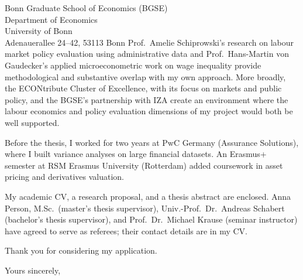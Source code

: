 \documentclass[a4paper,11pt]{letter}
\begin{document}
\begin{letter}{%
    Bonn Graduate School of Economics (BGSE) \\
    Department of Economics \\
    University of Bonn \\
    Adenauerallee 24--42, 53113 Bonn
}
Prof.\ Amelie Schiprowski's research on labour market policy evaluation using administrative data and Prof.\ Hans-Martin von Gaudecker's applied microeconometric work on wage inequality provide methodological and substantive overlap with my own approach. More broadly, the ECONtribute Cluster of Excellence, with its focus on markets and public policy, and the BGSE's partnership with IZA create an environment where the labour economics and policy evaluation dimensions of my project would both be well supported.

Before the thesis, I worked for two years at PwC Germany (Assurance Solutions), where I built variance analyses on large financial datasets. An Erasmus+ semester at RSM Erasmus University (Rotterdam) added coursework in asset pricing and derivatives valuation.

My academic CV, a research proposal, and a thesis abstract are enclosed. Anna Person, M.Sc.\ (master's thesis supervisor), Univ.-Prof.\ Dr.\ Andreas Schabert (bachelor's thesis supervisor), and Prof.\ Dr.\ Michael Krause (seminar instructor) have agreed to serve as referees; their contact details are in my CV.

Thank you for considering my application.

\closing{Yours sincerely,}

\end{letter}
\end{document}
